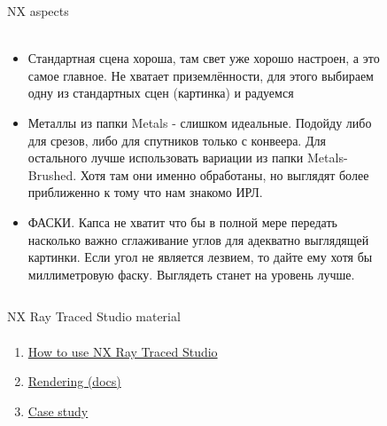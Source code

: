 \documentclass[aspectratio=169]{beamer}
\begin{document}
\begin{frame}[t]{NX aspects}
\framesubtitle{}
\begin{columns}[T,onlytextwidth]
    \begin{column}{0.69\textwidth}
        \begin{itemize}
            \scriptsize
            \item Стандартная сцена хороша, там свет уже хорошо настроен, а это самое главное. Не хватает приземлённости, для этого выбираем одну из стандартных сцен (картинка) и радуемся
            \item Металлы из папки Metals - слишком идеальные. Подойду либо для срезов, либо для спутников только с конвеера. Для остального лучше использовать вариации из папки Metals-Brushed. Хотя там они именно обработаны, но выглядят более приближенно к тому что нам знакомо ИРЛ.
            \item ФАСКИ. Капса не хватит что бы в полной мере передать насколько важно сглаживание углов для адекватно выглядящей картинки. Если угол не является лезвием, то дайте ему хотя бы миллиметровую фаску. Выглядеть станет на уровень лучше.
        \end{itemize}
    \end{column}
    \begin{column}{0.29\textwidth}
        \begin{figure}[H]
            \centering\includegraphics[height=5.5cm,width=1\textwidth,keepaspectratio]{standard_scence.jpg}
            \label{fig:standard_scence.jpg}
        \end{figure}
    \end{column}
\end{columns}
\end{frame}

\begin{frame}[t]{NX Ray Traced Studio material}
\framesubtitle{}
    \begin{enumerate}
        \item \href{https://youtu.be/uyGHuxEY5Gk}{How to use NX Ray Traced Studio}
        \item \href{https://docs.sw.siemens.com/en-US/doc/209349590/PL20200605195244930.viewing_rendering/xid1219739}{Rendering (docs)}
        \item \href{https://youtu.be/qPT449FupKU}{Case study}
    \end{enumerate}
\end{frame}
\end{document}
